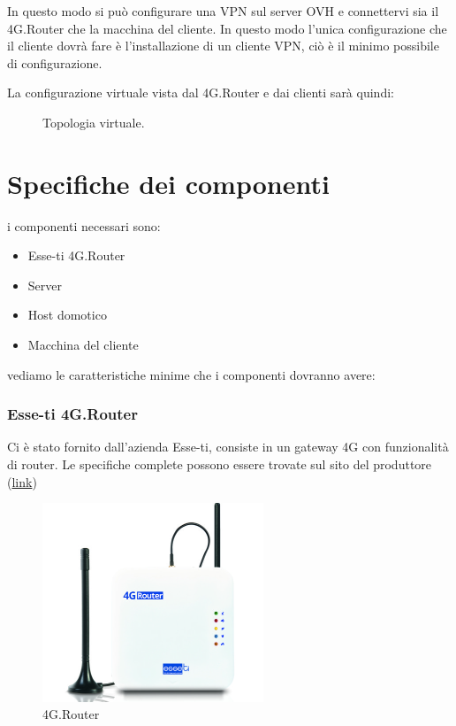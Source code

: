 In questo modo si pu\`o configurare una VPN sul server OVH e connettervi sia il 4G.Router che la macchina del cliente. In questo modo l'unica configurazione che il cliente dovr\`a fare \`e l'installazione di un cliente VPN, ci\`o \`e il minimo possibile di configurazione.

La configurazione virtuale vista dal 4G.Router e dai clienti sar\`a quindi:

\begin{figure}[ht]
	\centering
	
	\caption{Topologia virtuale. \cite{icons}}

	\label{fig:schema_architettura_virtuale}

\end{figure}


\section{Specifiche dei componenti}

i componenti necessari sono:

\begin{itemize}
	\item Esse-ti 4G.Router
	\item Server
	\item Host domotico
	\item Macchina del cliente
\end{itemize}

vediamo le caratteristiche minime che i componenti dovranno avere:

\subsubsection{Esse-ti 4G.Router}

Ci \`e stato fornito dall'azienda Esse-ti, consiste in un gateway 4G con funzionalità di router. Le specifiche complete possono essere trovate sul sito del produttore (\href{https://www.esse-ti.it/4g-router}{link})


\begin{figure}[ht]
	\centering
	\includegraphics[width=250px]{immagini/4grouter.jpg}
	\caption{4G.Router}

	\label{fig:esse-ti-router-4g}

\end{figure}

